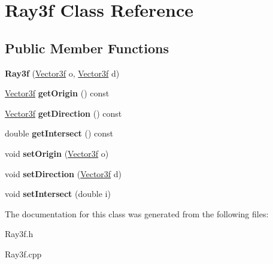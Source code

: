\hypertarget{class_ray3f}{}\section{Ray3f Class Reference}
\label{class_ray3f}
\subsection*{Public Member Functions}
\begin{DoxyCompactItemize}
\item 
\mbox{\label{class_ray3f_a35d36b08a02e89335b1ad865e291f9c5}} 
{\bfseries Ray3f} (\mbox{\hyperlink{class_vector3f}{Vector3f}} o, \mbox{\hyperlink{class_vector3f}{Vector3f}} d)
\item 
\mbox{\label{class_ray3f_a33c510ea76f584e1cec55c8719b5c3b0}} 
\mbox{\hyperlink{class_vector3f}{Vector3f}} {\bfseries get\+Origin} () const
\item 
\mbox{\label{class_ray3f_a1827ff88486d510b19e715af10e02935}} 
\mbox{\hyperlink{class_vector3f}{Vector3f}} {\bfseries get\+Direction} () const
\item 
\mbox{\label{class_ray3f_a7848c6486f8022c50eb1299422538129}} 
double {\bfseries get\+Intersect} () const
\item 
\mbox{\label{class_ray3f_adb303ff92b3a9b53b268592240c17833}} 
void {\bfseries set\+Origin} (\mbox{\hyperlink{class_vector3f}{Vector3f}} o)
\item 
\mbox{\label{class_ray3f_a6b47185e8115983b249bc650124666b5}} 
void {\bfseries set\+Direction} (\mbox{\hyperlink{class_vector3f}{Vector3f}} d)
\item 
\mbox{\label{class_ray3f_a0878928f5323833c590c229ca058d027}} 
void {\bfseries set\+Intersect} (double i)
\end{DoxyCompactItemize}


The documentation for this class was generated from the following files\+:\begin{DoxyCompactItemize}
\item 
Ray3f.\+h\item 
Ray3f.\+cpp\end{DoxyCompactItemize}
